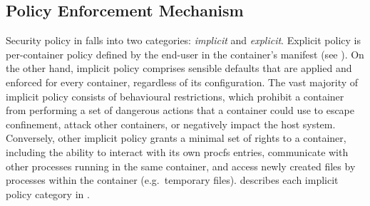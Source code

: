 \subsection{Policy Enforcement Mechanism}
\label{sub:enforcement}

Security policy in \bpfcontain{} falls into two categories: \textit{implicit} and \textit{explicit}. Explicit policy is per-container policy defined by the end-user in the container's manifest (see ). On the other hand, implicit policy comprises sensible defaults that are applied and enforced for every container, regardless of its configuration. The vast majority of implicit \bpfcontain{} policy consists of behavioural restrictions, which prohibit a container from performing a set of dangerous actions that a container could use to escape confinement, attack other containers, or negatively impact the host system. Conversely, other implicit policy grants a minimal set of rights to a container, including the ability to interact with its own procfs entries, communicate with other processes running in the same container, and access newly created files by processes within the container (e.g.~temporary files).  describes each implicit policy category in \bpfcontain{}.

